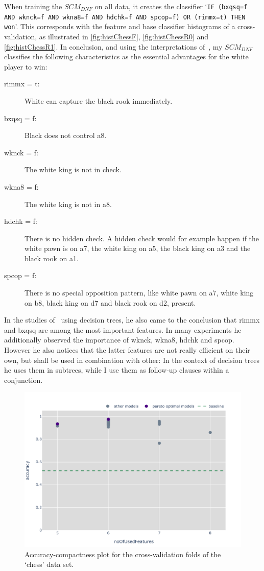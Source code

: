 
When training the \(SCM_{DNF}\) on all data, it creates the classifier `\texttt{IF (bxqsq=f AND wknck=f AND wkna8=f AND hdchk=f AND spcop=f) OR (rimmx=t) THEN\\won}'.
This corresponds with the feature and base classifier histograms of a cross-validation, as illustrated in \autoref{fig:histChessF}, \autoref{fig:histChessR0} and \autoref{fig:histChessR1}.
In conclusion, and using the interpretations of~\cite{shapiro}, my \(SCM_{DNF}\) classifies the following characteristics
as the essential advantages for the white player to win:

\begin{description}
    \item[rimmx = t:] White can capture the black rook immediately.
    \item[bxqsq = f:] Black does not control a8.
    \item[wknck = f:] The white king is not in check.
    \item[wkna8 = f:] The white king is not in a8.
    \item[hdchk = f:] There is no hidden check. A hidden check would for example happen if the white pawn is on a7, the white king on a5, the black king on a3 and the black rook on a1.
    \item[spcop = f:] There is no special opposition pattern, like white pawn on a7, white king on b8, black king on d7 and black rook on d2, present.
\end{description}

In the studies of~\cite{shapiro} using decision trees, he also came to the conclusion that rimmx and bxqsq are among the most important features.
In many experiments he additionally observed the importance of wknck, wkna8, hdchk and spcop.
However he also notices that the latter features are not really efficient on their own, but shall be used in combination with other:
In the context of decision trees he uses them in subtrees, while I use them as follow-up clauses within a conjunction.

\begin{figure}[H]
    \centering
    \includegraphics[width=0.85\columnwidth]{figures/chess/paretoFront.pdf}
    \caption{Accuracy-compactness plot for the cross-validation folds of the `chess' data set.}\label{fig:paretoChess}
\end{figure}

